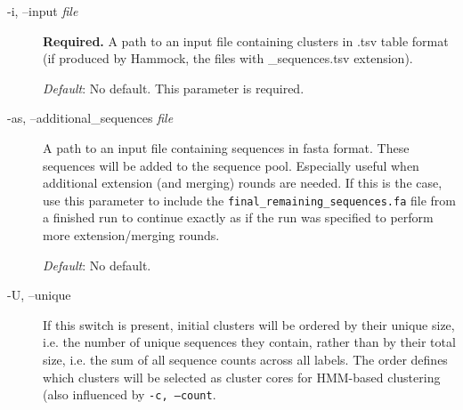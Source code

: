 \documentclass[11pt, a4paper, twoside, titlepage]{article}
\begin{document}
\begin{description}


	\item[-i, --input \rm \textlangle \textit{file}\textrangle] \textbf{Required.} A path to an input file containing clusters in .tsv table format (if produced by Hammock, the files with \_sequences.tsv extension).
	 
	  \textit{Default}: No default. This parameter is required.
	  
	 
	  
	 

	\item[-as, --additional\_sequences \rm \textlangle \textit{file}\textrangle]A path to an input file containing sequences in fasta format. These sequences will be added to the sequence pool. Especially useful when additional extension (and merging) rounds are needed. If this is the case, use this parameter to include the \texttt{final\_remaining\_sequences.fa} file from a finished run to continue exactly as if the run was specified to perform more extension/merging rounds. 
	 
	  \textit{Default}: No default.


 \item[-U, --unique] If this switch is present, initial clusters will be ordered by their unique size, i.e. the number of unique sequences they contain, rather than by their total size, i.e. the sum of all sequence counts across all labels. The order defines which clusters will be selected as cluster cores for HMM-based clustering (also influenced by \texttt{-c, --count}. 
	  

\end{description}
\end{document}
